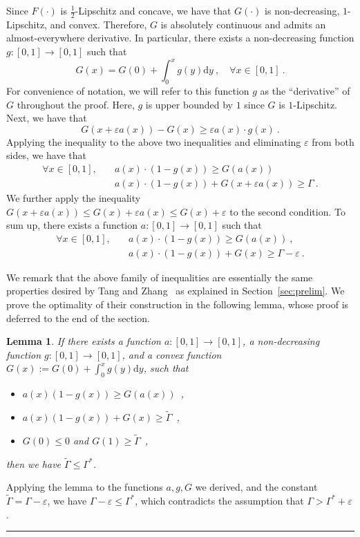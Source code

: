 \documentclass[11pt,letterpaper]{article}
\newenvironment{proof}{{\bf Proof:  }}{\hfill\rule{2mm}{2mm}\vspace*{5pt}}
\newtheorem{lemma}{Lemma}[section]
\newcommand{\dd}[1]{\mathrm{d}#1}
\newcommand{\eps}{\varepsilon}
\begin{document}
\begin{proof}
Since $F(\cdot)$ is $\frac{1}{2}$-Lipschitz and concave, we have that $G(\cdot)$ is non-decreasing, $1$-Lipschitz, and convex.
Therefore, $G$ is absolutely continuous and admits an almost-everywhere derivative. In particular, there exists a non-decreasing function $g : [0,1] \to [0,1]$ such that
\[
G(x) = G(0) + \int_0^x g(y) \dd y~, \quad \forall x \in [0,1]~.
\]
For convenience of notation, we will refer to this function $g$ as the ``derivative'' of $G$ throughout the proof.
Here, $g$ is upper bounded by $1$ since $G$ is $1$-Lipschitz.
Next, we have that
\[
G(x+\eps a(x))-G(x) \ge \eps a(x) \cdot g(x)~. 
\]
Applying the inequality to the above two inequalities and eliminating $\eps$ from both sides, we have that
\begin{align*}
\forall x \in [0,1], \quad & a(x) \cdot (1-g(x)) \ge G(a(x)) \\
& a(x) \cdot (1-g(x))+ G(x+\eps a(x)) \ge \Gamma~.
\end{align*}
We further apply the inequality $G(x+\eps a(x)) \le G(x)+\eps a(x) \le G(x) + \eps$ to the second condition.
To sum up, there exists a function $a:[0,1] \to [0,1]$ such that
\begin{align*}
\forall x \in [0,1], \quad & a(x) \cdot (1-g(x)) \ge G(a(x)) ~,\\
& a(x) \cdot (1-g(x))+G(x) \ge \Gamma - \eps~.
\end{align*}

We remark that the above family of inequalities are essentially the same properties desired by Tang and Zhang~\cite{ec/TangZ24} as explained in Section~\ref{sec:prelim}. We prove the optimality of their construction in the following lemma, whose proof is deferred to the end of the section.
\begin{lemma}
\label{lem:optimal}
If there exists a function $a:[0,1] \to [0,1]$, a non-decreasing function $g:[0,1] \to [0,1]$, and a convex function $G(x):= G(0) + \int_0^x g(y) \dd y$, such that
\begin{itemize}
\item $a(x) (1-g(x)) \ge G(a(x))$~,
\item $a(x) (1-g(x)) + G(x) \ge \tilde\Gamma$~,
\item $G(0) \le 0$ and $G(1) \ge \tilde{\Gamma}$~,
\end{itemize}
then we have $\tilde{\Gamma} \le \Gamma^*$.
\end{lemma}
Applying the lemma to the functions $a,g,G$ we derived, and the constant $\tilde\Gamma=\Gamma-\eps$, we have $\Gamma-\eps \le \Gamma^*$, which contradicts the assumption that $\Gamma > \Gamma^* + \eps$.
\end{proof}
\end{document}
